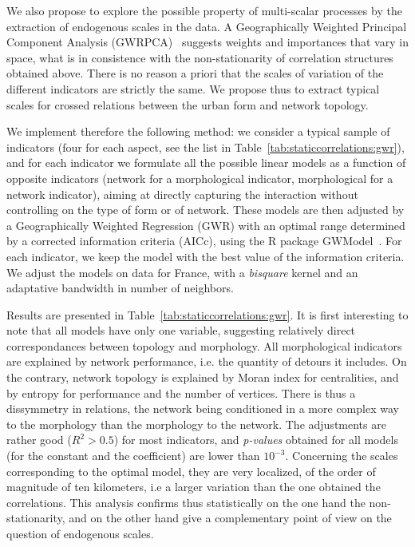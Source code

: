 We also propose to explore the possible property of multi-scalar processes by the extraction of endogenous scales  in the data. A Geographically Weighted Principal Component Analysis (GWRPCA)~\cite{harris2011geographically}  suggests weights and importances that vary in space, what is in consistence with the non-stationarity of correlation structures obtained above. There is no reason a priori that the scales of variation of the different indicators are strictly the same. We propose thus to extract typical scales for crossed relations between the urban form and network topology.

We implement therefore the following method: we consider a typical sample of indicators (four for each aspect, see the list in Table~\ref{tab:staticcorrelations:gwr}), and for each indicator we formulate all the possible linear models as a function of opposite indicators (network for a morphological indicator, morphological for a network indicator), aiming at directly capturing the interaction without controlling on the type of form or of network. These models are then adjusted by a Geographically Weighted Regression (GWR) with an optimal range determined by a corrected information criteria (AICc), using the R package GWModel~\citep{gollini2013gwmodel}. For each indicator, we keep the model with the best value of the information criteria. We adjust the models on data for France, with a \emph{bisquare} kernel and an adaptative bandwidth in number of neighbors.


Results are presented in Table~\ref{tab:staticcorrelations:gwr}. It is first interesting to note that all models have only one variable, suggesting relatively direct correspondances between topology and morphology. All morphological indicators are explained by network performance, i.e. the quantity of detours it includes. On the contrary, network topology is explained by Moran index for centralities, and by entropy for performance and the number of vertices. There is thus a dissymmetry in relations, the network being conditioned in a more complex way to the morphology than the morphology to the network. The adjustments are rather good ($R^2 > 0.5$) for most indicators, and \emph{p-values} obtained for all models (for the constant and the coefficient) are lower than $10^{-3}$. Concerning the scales corresponding to the optimal model, they are very localized, of the order of magnitude of ten kilometers, i.e a larger variation than the one obtained the correlations. This analysis confirms thus statistically on the one hand the non-stationarity, and on the other hand give a complementary point of view on the question of endogenous scales.









